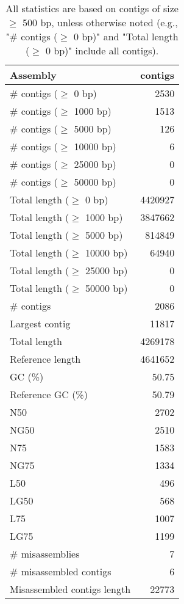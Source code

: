 \documentclass[12pt,a4paper]{article}
\begin{document}
\begin{table}[ht]
\begin{center}
\caption{All statistics are based on contigs of size $\geq$ 500 bp, unless otherwise noted (e.g., "\# contigs ($\geq$ 0 bp)" and "Total length ($\geq$ 0 bp)" include all contigs).}
\begin{tabular}{|l*{1}{|r}|}
\hline
Assembly & contigs \\ \hline
\# contigs ($\geq$ 0 bp) & 2530 \\ \hline
\# contigs ($\geq$ 1000 bp) & 1513 \\ \hline
\# contigs ($\geq$ 5000 bp) & 126 \\ \hline
\# contigs ($\geq$ 10000 bp) & 6 \\ \hline
\# contigs ($\geq$ 25000 bp) & 0 \\ \hline
\# contigs ($\geq$ 50000 bp) & 0 \\ \hline
Total length ($\geq$ 0 bp) & 4420927 \\ \hline
Total length ($\geq$ 1000 bp) & 3847662 \\ \hline
Total length ($\geq$ 5000 bp) & 814849 \\ \hline
Total length ($\geq$ 10000 bp) & 64940 \\ \hline
Total length ($\geq$ 25000 bp) & 0 \\ \hline
Total length ($\geq$ 50000 bp) & 0 \\ \hline
\# contigs & 2086 \\ \hline
Largest contig & 11817 \\ \hline
Total length & 4269178 \\ \hline
Reference length & 4641652 \\ \hline
GC (\%) & 50.75 \\ \hline
Reference GC (\%) & 50.79 \\ \hline
N50 & 2702 \\ \hline
NG50 & 2510 \\ \hline
N75 & 1583 \\ \hline
NG75 & 1334 \\ \hline
L50 & 496 \\ \hline
LG50 & 568 \\ \hline
L75 & 1007 \\ \hline
LG75 & 1199 \\ \hline
\# misassemblies & 7 \\ \hline
\# misassembled contigs & 6 \\ \hline
Misassembled contigs length & 22773 \\ \hline

\end{tabular}
\end{center}
\end{table}
\end{document}

